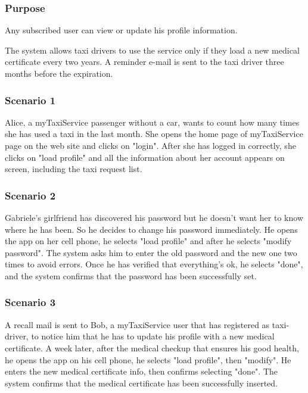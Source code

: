 \label{user-profile}
\subsubsection{Purpose}
Any subscribed user can view or update his profile information. 

The system allows taxi drivers to use the service only if they load a new medical certificate every two years. A reminder e-mail is sent to the taxi driver three months before the expiration. %


\subsubsection{Scenario 1}
Alice, a myTaxiService passenger without a car, wants to count how many times she has used a taxi in the last month.
She opens the home page of myTaxiService page on the web site and clicks on "login". 
After she has logged in correctly, she clicks on "load profile" and all the information about her account appears on screen, including the taxi request list. 

\subsubsection{Scenario 2}
Gabriele's girlfriend has discovered his password but he doesn't want her to know where he has been. So he decides to change his password immediately. He opens the app on her cell phone, he selects "load profile" and after he selects "modify password". The system asks him to enter the old password and the new one two times to avoid errors. Once he has verified that everything's ok, he selects "done", and the system confirms that the password has been successfully set.

\subsubsection{Scenario 3}
A recall mail is sent to Bob, a myTaxiService user that has registered as taxi-driver, to notice him that he has to update his profile with a new medical certificate. A week later, after the medical checkup that ensures his good health, he opens the app on his cell phone, he selects "load profile", then "modify". He enters the new medical certificate info, then confirms selecting "done". The system confirms that the medical certificate has been successfully inserted.

